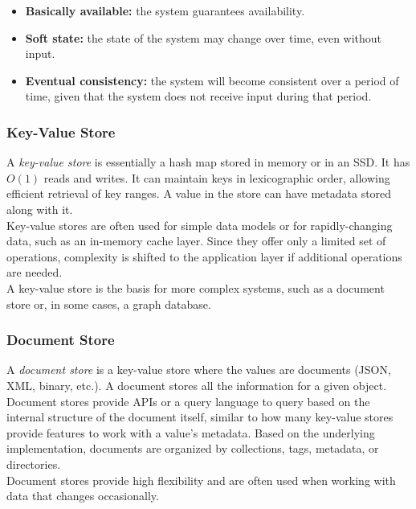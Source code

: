 \documentclass[12pt, titlepage]{article}
\begin{document}
\begin{itemize}
  \item \textbf{Basically available:} the system guarantees availability.
  \item \textbf{Soft state:} the state of the system may change over time, even without input.
  \item \textbf{Eventual consistency:} the system will become consistent over a period of time, given that the system does not receive input during that period.
\end{itemize}

\subsubsection{Key-Value Store}

A \textit{key-value store} is essentially a hash map stored in memory or in an SSD. It has $O(1)$ reads and writes. It can maintain keys in lexicographic order, allowing efficient retrieval of key ranges. A value in the store can have metadata stored along with it. \\

Key-value stores are often used for simple data models or for rapidly-changing data, such as an in-memory cache layer. Since they offer only a limited set of operations, complexity is shifted to the application layer if additional operations are needed. \\

A key-value store is the basis for more complex systems, such as a document store or, in some cases, a graph database.

\subsubsection{Document Store}

A \textit{document store} is a key-value store where the values are documents (JSON, XML, binary, etc.). A document stores all the information for a given object. \\

Document stores provide APIs or a query language to query based on the internal structure of the document itself, similar to how many key-value stores provide features to work with a value's metadata. Based on the underlying implementation, documents are organized by collections, tags, metadata, or directories. \\

Document stores provide high flexibility and are often used when working with data that changes occasionally. \\
\end{document}

